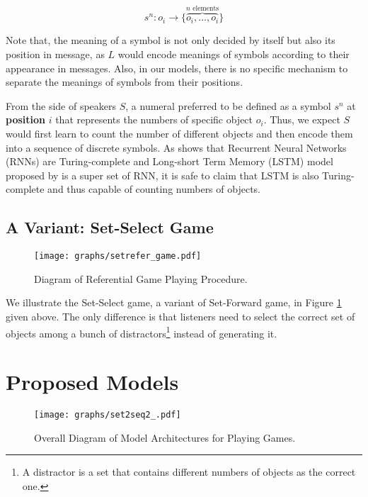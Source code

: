 \begin{equation}
  s^n: o_i \rightarrow \{\overbrace{o_i, \dots, o_i}^{n \mbox{ elements}}\}
  \label{eq:3.1numeral_define}
\end{equation}

Note that, the meaning of a symbol is not only decided by itself but also its position in message, as $L$ would encode meanings of symbols according to their appearance in messages. Also, in our models, there is no specific mechanism to separate the meanings of symbols from their positions.

From the side of speakers $S$, a numeral preferred to be defined as a symbol $s^n$ at \textbf{position} $i$ that represents the numbers of specific object $o_i$. Thus, we expect $S$ would first learn to count the number of different objects and then encode them into a sequence of discrete symbols. As \cite{Siegelmann1992NN} shows that Recurrent Neural Networks (RNNs) are Turing-complete and Long-short Term Memory (LSTM) model proposed by \cite{hochreiter1997long} is a super set of RNN, it is safe to claim that LSTM is also Turing-complete and thus capable of counting numbers of objects.

\subsection{A Variant: Set-Select Game}
\label{ssec:3.1.3:refer_game}

\begin{figure}[!h]
  \centering
  \texttt{[image: graphs/setrefer\_game.pdf]}
  \caption{Diagram of Referential Game Playing Procedure.}
  \label{fig3:refer_game_procedure}
\end{figure}

We illustrate the Set-Select game, a variant of Set-Forward game, in Figure \ref{fig3:refer_game_procedure} given above. The only difference is that listeners need to select the correct set of objects among a bunch of distractors\footnote{A distractor is a set that contains different numbers of objects as the correct one.} instead of generating it. 

\section{Proposed Models}
\label{sec3.2:models}

\begin{figure}[!h]
  \centering
  \texttt{[image: graphs/set2seq2\_.pdf]}
  \caption{Overall Diagram of Model Architectures for Playing Games.}
  \label{fig4:model_arch}
\end{figure}

